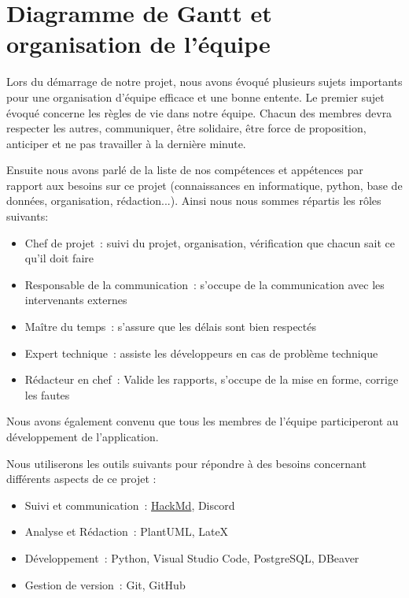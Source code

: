 \documentclass[11pt]{article}
\begin{document}

\newpage
\section{Diagramme de Gantt et organisation de l'équipe}
Lors du démarrage de notre projet, nous avons évoqué plusieurs sujets importants pour une organisation d'équipe efficace et une bonne entente. Le premier sujet évoqué concerne les règles de vie dans notre équipe. Chacun des membres devra respecter les autres, communiquer, être solidaire, être force de proposition, anticiper et ne pas travailler à la dernière minute.


\bigbreak

Ensuite nous avons parlé de la liste de nos compétences et appétences par rapport aux besoins sur ce projet (connaissances en informatique, python, base de données, organisation, rédaction...). Ainsi nous nous sommes répartis les rôles suivants:
\begin{itemize}
    \item{Chef de projet~: suivi du projet, organisation, vérification que chacun sait ce qu’il doit faire}
    \item{Responsable de la communication~: s'occupe de la communication avec les intervenants externes}
    \item{Maître du temps~: s’assure que les délais sont bien respectés}
    \item{Expert technique~: assiste les développeurs en cas de problème technique}
    \item{Rédacteur en chef~: Valide les rapports, s'occupe de la mise en forme, corrige les fautes}
\end{itemize}

Nous avons également convenu que tous les membres de l'équipe participeront au développement de l'application.

\bigbreak

Nous utiliserons les outils suivants pour répondre à des besoins concernant différents aspects de ce projet :
\begin{itemize}
    \item{Suivi et communication~: \href{https://hackmd.io/CMTCDVW6Spe2PHXOhdKTRQ}{HackMd}, Discord}
    \item{Analyse et Rédaction~: PlantUML, LateX}
    \item{Développement~: Python, Visual Studio Code, PostgreSQL, DBeaver}
    \item{Gestion de version~: Git, GitHub}
\end{itemize}
\end{document}
